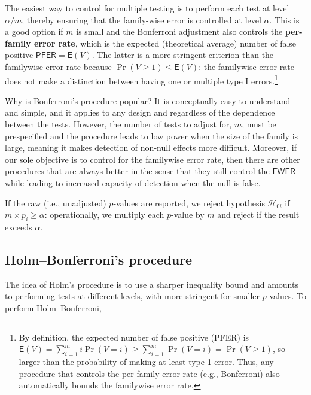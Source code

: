 \documentclass[
  11pt,
  letterpaper,
]{scrbook}
\theoremstyle{definition}
\theoremstyle{remark}
\begin{document}
The easiest way to control for multiple testing is to perform each test
at level \(\alpha/m\), thereby ensuring that the family-wise error is
controlled at level \(\alpha\). This is a good option if \(m\) is small
and the Bonferroni adjustment also controls the \textbf{per-family error
rate}, which is the expected (theoretical average) number of false
positive \(\mathsf{PFER} = \mathsf{E}(V)\). The latter is a more
stringent criterion than the familywise error rate because
\(\Pr(V \geq 1) \leq \mathsf{E}(V)\): the familywise error rate does not
make a distinction between having one or multiple type I
errors.\footnote{By definition, the expected number of false positive
  (PFER) is
  \(\mathsf{E}(V) = \sum_{i=1}^m i \Pr(V=i) \geq \sum_{i=1}^m \Pr(V=i) = \Pr(V \geq 1)\),
  so larger than the probability of making at least type 1 error. Thus,
  any procedure that controls the per-family error rate (e.g.,
  Bonferroni) also automatically bounds the familywise error rate.}

Why is Bonferroni's procedure popular? It is conceptually easy to
understand and simple, and it applies to any design and regardless of
the dependence between the tests. However, the number of tests to adjust
for, \(m\), must be prespecified and the procedure leads to low power
when the size of the family is large, meaning it makes detection of
non-null effects more difficult. Moreover, if our sole objective is to
control for the familywise error rate, then there are other procedures
that are always better in the sense that they still control the
\(\mathsf{FWER}\) while leading to increased capacity of detection when
the null is false.

If the raw (i.e., unadjusted) \(p\)-values are reported, we reject
hypothesis \(\mathscr{H}_{0i}\) if \(m \times p_i \ge \alpha\):
operationally, we multiply each \(p\)-value by \(m\) and reject if the
result exceeds \(\alpha\).

\hypertarget{holmbonferronis-procedure}{%
\subsection{Holm--Bonferroni's
procedure}\label{holmbonferronis-procedure}}

The idea of Holm's procedure is to use a sharper inequality bound and
amounts to performing tests at different levels, with more stringent for
smaller \(p\)-values. To perform Holm--Bonferroni,
\end{document}
